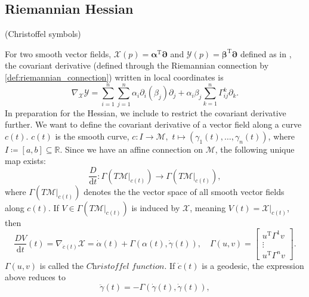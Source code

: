 \subsection{Riemannian Hessian}
(Christoffel symbols)

For two smooth vector fields, $\mathcal{X}(p)=\mathbf{\alpha}^{\mathrm{T}}\mathbf{\partial}$ and $\mathcal{Y}(p)=\mathbf{\beta}^{\mathrm{T}}\mathbf{\partial}$ defined as in , the covariant derivative (defined through the Riemannian connection by \cref{def:riemannian_connection}) written in local coordinates is
\begin{equation*}
    \nabla_{\mathcal{X}}\mathcal{Y}=\sum\limits_{i=1}^{n}\sum\limits_{j=1}^{n}\alpha_{i}\partial_{i}(\beta_{j})\partial_{j}+\alpha_{i}\beta_{j}\sum\limits_{k=1}^{n}\Gamma_{ij}^{k}\partial_{k}.
\end{equation*}
In preparation for the Hessian, we include \cite[p.~96]{Tu2017} to restrict the covariant derivative further. We want to define the covariant derivative of a vector field along a curve $c(t)$. $c(t)$ is the smooth curve, $c:I\xrightarrow{}\mathcal{M},$ $t\mapsto(\gamma_{1}(t), \dots, \gamma_{n}(t))$, where $I \coloneqq [a,b]\subseteq \mathbb{R}$. Since we have an affine connection on $\mathcal{M}$, the following unique map exists:
\begin{equation*}
    \frac{D}{\mathrm{d}t}:\Gamma(T \mathcal{M}|_{c(t)})\xrightarrow{}\Gamma(T \mathcal{M}|_{c(t)}),
\end{equation*}
where $\Gamma(T \mathcal{M}|_{c(t)})$ denotes the the vector space of all smooth vector fields along $c(t)$. If $V\in \Gamma(T \mathcal{M}|_{c(t)})$ is induced by $\mathcal{X}$, meaning $V(t)=\mathcal{X}|_{c(t)}$, then
\begin{equation*}
    \frac{DV}{\mathrm{d}t}(t)=\nabla_{\dot{c}(t)}\mathcal{X}=\dot{\alpha}(t)+\Gamma(\alpha(t), \dot{\gamma}(t)),\quad \Gamma(u,v)=\begin{bmatrix}u ^{\mathrm{T}}\Gamma^{1}v \\ \vdots \\ u ^{\mathrm{T}}\Gamma^{n}v\end{bmatrix}.
\end{equation*}
$\Gamma(u,v)$ is called the $\textit{Christoffel function}$. If $\dot{c}(t)$ is a geodesic, the expression above reduces to 
\begin{equation}\label{eq:christoffel_symbols_through_geodesic}
    \ddot{\gamma}(t)=-\Gamma(\dot{\gamma}(t),\dot{\gamma}(t)),
\end{equation}
